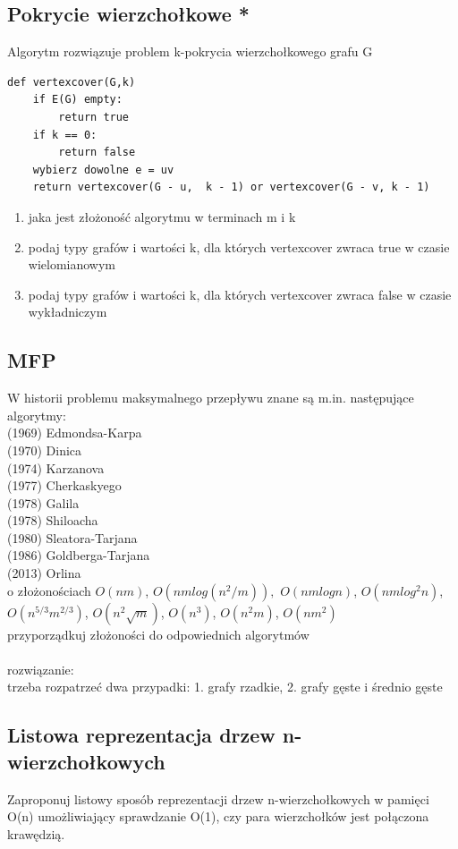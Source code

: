 \documentclass{article}
\begin{document}
\subsection*{Pokrycie wierzchołkowe *}
Algorytm rozwiązuje problem k-pokrycia wierzchołkowego grafu G
\begin{lstlisting}
def vertexcover(G,k)
	if E(G) empty: 
		return true
	if k == 0:
		return false
	wybierz dowolne e = uv
	return vertexcover(G - u,  k - 1) or vertexcover(G - v, k - 1)
\end{lstlisting}
\begin{enumerate}
	\item jaka jest złożoność algorytmu w terminach m i k
	\item podaj typy grafów i wartości k, dla których vertexcover zwraca true w czasie wielomianowym
	\item podaj typy grafów i wartości k, dla których vertexcover zwraca false w czasie wykładniczym
\end{enumerate}

\subsection*{MFP}
W historii problemu maksymalnego przepływu znane są m.in.  następujące algorytmy:\\
(1969) Edmondsa-Karpa \\
(1970) Dinica \\
(1974) Karzanova \\
(1977) Cherkaskyego \\
(1978) Galila \\
(1978) Shiloacha \\
(1980) Sleatora-Tarjana \\
(1986) Goldberga-Tarjana \\
(2013) Orlina \\
o złożonościach $O(nm)$, $O(nmlog(n^2/m)),$ $O(nmlogn)$, $O(nmlog^2n)$, $O(n^{5/3}m^{2/3})$, $O(n^2\sqrt m)$, $O(n^3)$, $O(n^2m)$, $O(nm^2)$ \\
przyporządkuj złożoności do odpowiednich algorytmów \\\\ rozwiązanie: \\
trzeba rozpatrzeć dwa przypadki: 1. grafy rzadkie, 2. grafy gęste i średnio gęste

\subsection*{Listowa reprezentacja drzew n-wierzchołkowych}
Zaproponuj listowy sposób reprezentacji drzew n-wierzchołkowych w pamięci O(n) umożliwiający sprawdzanie O(1), 
czy para wierzchołków jest połączona krawędzią. 
\end{document}
